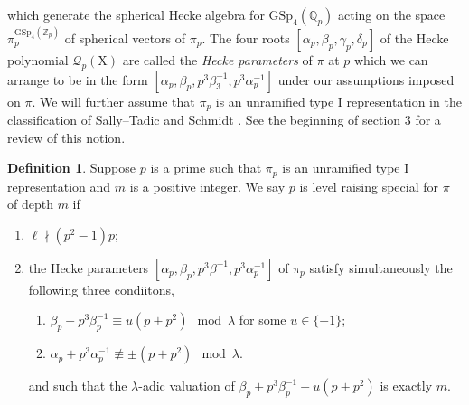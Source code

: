 \documentclass[10pt]{amsart}
\numberwithin{equation}{section}
\theoremstyle{definition}
\newtheorem{definition}[equation]{Definition}
\def\GSp{\mathrm{GSp}}
\def\calQ{\mathcal{Q}}
\def\QQ{\mathbb{Q}}
\def\ZZ{\mathbb{Z}}
\def\rmI{\mathrm{I}}
\def\rmX{\mathrm{X}}
\def\rmT{\mathrm{T}}
\begin{document}
which generate the spherical Hecke algebra for $\GSp_{4}(\QQ_{p})$ acting on the space $\pi^{\GSp_{4}(\ZZ_{p})}_{p}$ of spherical vectors of $\pi_{p}$.
The four roots $[\alpha_{p}, \beta_{p}, \gamma_{p}, \delta_{p}]$ of the Hecke polynomial $\calQ_{p}(\rmX)$ are called the \emph{Hecke parameters} of $\pi$ at $p$ which we can arrange to be in the form $[\alpha_{p}, \beta_{p}, p^{3}\beta^{-1}_{3}, p^{3}\alpha^{-1}_{p}]$ under our assumptions imposed on $\pi$.  
We will further assume that $\pi_{p}$ is an unramified type $\rmI$ representation in the classification of Sally--Tadic \cite{ST-classification} and Schmidt \cite{Sch-Iwahori}. See the beginning of section $3$ for a review of this notion.
\begin{definition}
Suppose $p$ is a prime such that $\pi_{p}$ is an unramified type $\rmI$ representation and $m$ is a positive integer. We say $p$ is level raising special for $\pi$ of depth $m$ if 
\begin{enumerate}
\item $\ell\nmid (p^{2}-1)p$;
\item the Hecke parameters $[\alpha_{p}, \beta_{p}, p^{3}\beta^{-1}, p^{3}\alpha^{-1}_{p}]$ of $\pi_{p}$ satisfy simultaneously the following three condiitons, 
\begin{enumerate}
\item $\beta_{p}+p^{3}\beta^{-1}_{p}\equiv u (p+ p^{2})\mod \lambda$ for some $u\in\{\pm1\}$;
\item $\alpha_{p}+p^{3}\alpha^{-1}_{p}\not\equiv \pm (p+ p^{2})\mod \lambda$.
\end{enumerate} 
and such that the $\lambda$-adic valuation of $\beta_{p}+p^{3}\beta^{-1}_{p}-u (p+ p^{2})$ is exactly $m$.
\end{enumerate}
\end{definition}
\end{document}
